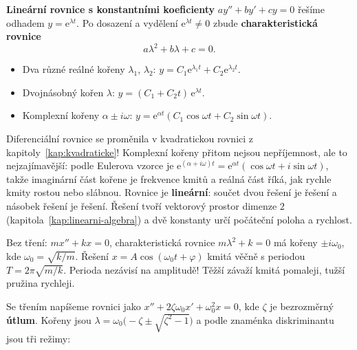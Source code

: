 \begin{definitionbox}
  \textbf{Lineární rovnice s konstantními koeficienty} $ay'' + by' + cy = 0$ řešíme odhadem $y = \mathrm{e}^{\lambda t}$. Po dosazení a vydělení $\mathrm{e}^{\lambda t}\neq 0$ zbude \textbf{charakteristická rovnice}
  \begin{equation*}
    a\lambda^2 + b\lambda + c = 0.
  \end{equation*}
  \begin{itemize}
    \item Dva různé reálné kořeny $\lambda_1$, $\lambda_2$: $y = C_1\mathrm{e}^{\lambda_1t} + C_2\mathrm{e}^{\lambda_2t}$.
    \item Dvojnásobný kořen $\lambda$: $y = (C_1 + C_2t)\,\mathrm{e}^{\lambda t}$.
    \item Komplexní kořeny $\alpha\pm i\omega$: $y = \mathrm{e}^{\alpha t}(C_1\cos\omega t + C_2\sin\omega t)$.
  \end{itemize}
\end{definitionbox}

Diferenciální rovnice se proměnila v kvadratickou rovnici z kapitoly~\ref{kap:kvadraticke}! Komplexní kořeny přitom nejsou nepříjemnost, ale to nejzajímavější: podle Eulerova vzorce je $\mathrm{e}^{(\alpha + i\omega)t} = \mathrm{e}^{\alpha t}(\cos\omega t + i\sin\omega t)$, takže imaginární část kořene je frekvence kmitů a reálná část říká, jak rychle kmity rostou nebo slábnou. Rovnice je \textbf{lineární}: součet dvou řešení je řešení a násobek řešení je řešení. Řešení tvoří vektorový prostor dimenze $2$ (kapitola~\ref{kap:linearni-algebra}) a dvě konstanty určí počáteční poloha a rychlost.

\begin{example}
  Bez tření: $mx'' + kx = 0$, charakteristická rovnice $m\lambda^2 + k = 0$ má kořeny $\pm i\omega_0$, kde $\omega_0 = \sqrt{k/m}$. Řešení $x = A\cos(\omega_0t + \varphi)$ kmitá věčně s periodou $T = 2\pi\sqrt{m/k}$. Perioda nezávisí na amplitudě! Těžší závaží kmitá pomaleji, tužší pružina rychleji.
\end{example}

Se třením napíšeme rovnici jako $x'' + 2\zeta\omega_0x' + \omega_0^2x = 0$, kde $\zeta$ je bezrozměrný \textbf{útlum}. Kořeny jsou $\lambda = \omega_0\big(-\zeta\pm\sqrt{\zeta^2 - 1}\big)$ a podle znaménka diskriminantu jsou tři režimy:

